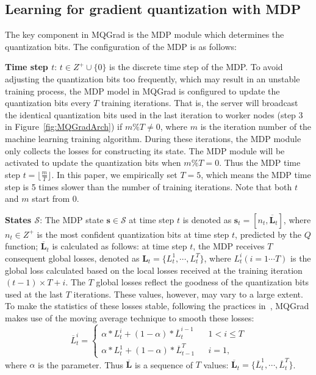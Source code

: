 \documentclass[sigconf]{acmart}
\begin{document}
\subsection{Learning for gradient quantization with MDP}
The key component in MQGrad is the MDP module which determines the quantization bits. The configuration of the MDP is as follows:

\textbf{Time step $t$}: $t\in Z^+ \cup \{0\}$ is the discrete time step of the MDP. To avoid adjusting the quantization bits too frequently, which may result in an unstable training process, the MDP model in MQGrad is configured to update the quantization bits every $T$ training iterations. That is, the server will broadcast the identical quantization bits used in the last iteration to worker nodes (step 3 in Figure~\ref{fig:MQGradArch}) if $m\%T \neq 0$, where $m$ is the iteration number of the machine learning training algorithm. During these iterations, the MDP module only collects the losses for constructing its state. The MDP module will be activated to update the quantization bits when $m\%T = 0$. Thus the MDP time step $t = \lfloor \frac{m}{T}\rfloor$. In this paper, we empirically set $T=5$, which means the MDP time step is 5 times slower than the number of training iterations. Note that both $t$ and $m$ start from 0.


\textbf{States $\mathcal{S}$}: The MDP state $\textbf{s} \in \mathcal{S}$ at time step $t$ is denoted as $\textbf{s}_t =\left[n_t, \overline{\mathbf{L}}_t\right]$, where $n_t \in Z^+$ is the most confident quantization bits at time step $t$, predicted by the $Q$ function; $\overline{\mathbf{L}}_t$ is calculated as follows: at time step $t$, the MDP receives $T$ consequent global losses, denoted as $\mathbf{L}_t=\{L_t^1, \cdots, L_t^{T}\}$, where $L_t^{i} (i=1\cdots T)$ is the global loss calculated based on the local losses received at the training iteration $(t-1)\times T + i$. The $T$ global losses reflect the goodness of the quantization bits used at the last $T$ iterations. These values, however, may vary to a large extent. To make the statistics of these losses stable, following the practices in~\cite{daniel2016learning}, MQGrad makes use of the moving average technique to smooth these losses:
\begin{equation}\label{eq:movingAvg}
	\overline{L}_t^i = \left\{
	\begin{array}{rcl}
		\alpha * L_t^i + (1 - \alpha)*\overline{L}_t^{i-1}     &  & 1 < i \leq T \\
		\alpha * L_t^1 + (1 - \alpha) * \overline{L}_{t-1}^{T} &  & i = 1,
	\end{array} \right.
\end{equation}
where $\alpha$ is the parameter. Thus $\overline{\mathbf{L}}$ is a sequence of $T$ values: $\overline{\mathbf{L}}_t= \{\overline{L}_t^1, \cdots, \overline{L}_t^{T}\}$.
\end{document}
